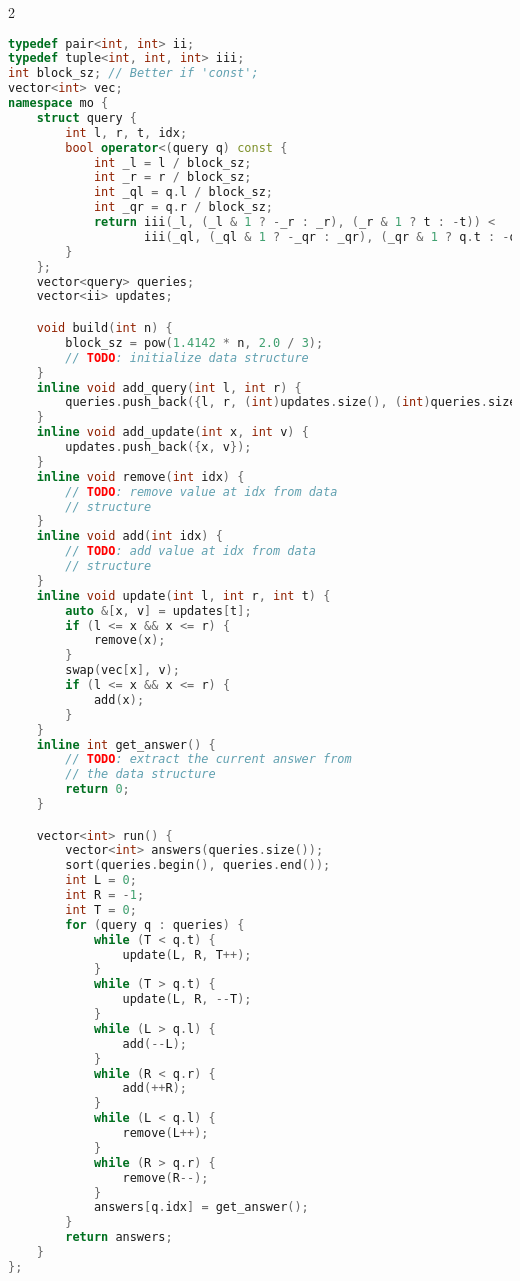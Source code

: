 \documentclass[11pt, a4paper, oneside]{book}
\begin{document}
\hfill

\begin{multicols}{2}
\begin{lstlisting}[language=C++]
typedef pair<int, int> ii;
typedef tuple<int, int, int> iii;
int block_sz; // Better if 'const';
vector<int> vec;
namespace mo {
    struct query {
        int l, r, t, idx;
        bool operator<(query q) const {
            int _l = l / block_sz;
            int _r = r / block_sz;
            int _ql = q.l / block_sz;
            int _qr = q.r / block_sz;
            return iii(_l, (_l & 1 ? -_r : _r), (_r & 1 ? t : -t)) <
                   iii(_ql, (_ql & 1 ? -_qr : _qr), (_qr & 1 ? q.t : -q.t));
        }
    };
    vector<query> queries;
    vector<ii> updates;

    void build(int n) {
        block_sz = pow(1.4142 * n, 2.0 / 3);
        // TODO: initialize data structure
    }
    inline void add_query(int l, int r) {
        queries.push_back({l, r, (int)updates.size(), (int)queries.size()});
    }
    inline void add_update(int x, int v) {
        updates.push_back({x, v});
    }
    inline void remove(int idx) {
        // TODO: remove value at idx from data
        // structure
    }
    inline void add(int idx) {
        // TODO: add value at idx from data
        // structure
    }
    inline void update(int l, int r, int t) {
        auto &[x, v] = updates[t];
        if (l <= x && x <= r) {
            remove(x);
        }
        swap(vec[x], v);
        if (l <= x && x <= r) {
            add(x);
        }
    }
    inline int get_answer() {
        // TODO: extract the current answer from
        // the data structure
        return 0;
    }

    vector<int> run() {
        vector<int> answers(queries.size());
        sort(queries.begin(), queries.end());
        int L = 0;
        int R = -1;
        int T = 0;
        for (query q : queries) {
            while (T < q.t) {
                update(L, R, T++);
            }
            while (T > q.t) {
                update(L, R, --T);
            }
            while (L > q.l) {
                add(--L);
            }
            while (R < q.r) {
                add(++R);
            }
            while (L < q.l) {
                remove(L++);
            }
            while (R > q.r) {
                remove(R--);
            }
            answers[q.idx] = get_answer();
        }
        return answers;
    }
};
\end{lstlisting}
\end{multicols}
\end{document}
